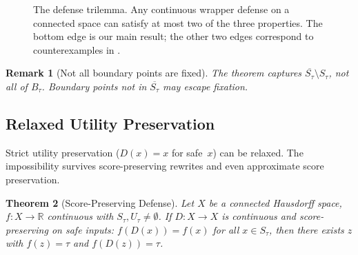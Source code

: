 \documentclass{article}
\newtheorem{theorem}{Theorem}[section]
\newtheorem{remark}[theorem]{Remark}
\newcommand{\R}{\mathbb{R}}
\newcommand{\cl}[1]{\overline{#1}}
\begin{document}
\begin{figure}[t]
\centering
{}
\caption{The defense trilemma. Any continuous wrapper defense on a
connected space can satisfy at most two of
the three properties. The bottom edge is our main result; the other
two edges correspond to counterexamples in .}
\label{fig:trilemma}
\end{figure}

\begin{remark}[Not all boundary points are fixed]
The theorem captures $\cl{S_\tau} \setminus S_\tau$, not all of
$B_\tau$. Boundary points not in $\cl{S_\tau}$ may escape fixation.
\end{remark}


\subsection{Relaxed Utility Preservation}
\label{sec:relaxed}

Strict utility preservation ($D(x) = x$ for safe~$x$) can be
relaxed. The impossibility survives score-preserving rewrites and
even approximate score preservation.

\begin{theorem}[Score-Preserving Defense]
\label{thm:score-preserving}
Let $X$ be a connected Hausdorff space, $f\colon X\to\R$ continuous
with $S_\tau, U_\tau \neq \emptyset$. If $D\colon X \to X$ is
continuous and \emph{score-preserving on safe inputs}:
$f(D(x)) = f(x)$ for all $x \in S_\tau$, then there exists $z$ with
$f(z) = \tau$ and $f(D(z)) = \tau$.
\end{theorem}
\end{document}
